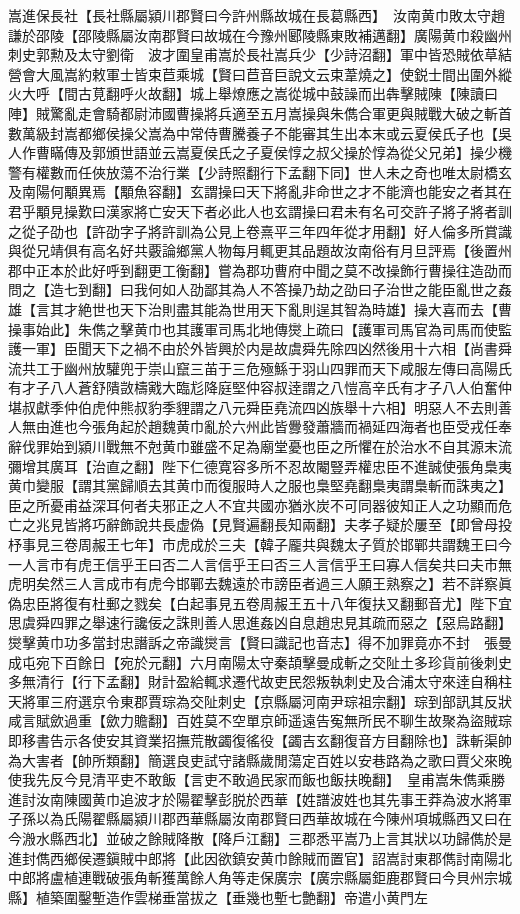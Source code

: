 嵩進保長社【長社縣屬潁川郡賢曰今許州縣故城在長葛縣西】　汝南黄巾敗太守趙謙於邵陵【邵陵縣屬汝南郡賢曰故城在今豫州郾陵縣東敗補邁翻】廣陽黄巾殺幽州刺史郭勲及太守劉衛　波才圍皇甫嵩於長社嵩兵少【少詩沼翻】軍中皆恐賊依草結營會大風嵩約敕軍士皆束苣乘城【賢曰苣音巨說文云束葦燒之】使鋭士間出圍外縱火大呼【間古莧翻呼火故翻】城上舉燎應之嵩從城中鼓譟而出犇擊賊陳【陳讀曰陣】賊驚亂走會騎都尉沛國曹操將兵適至五月嵩操與朱儁合軍更與賊戰大破之斬首數萬級封嵩都鄉侯操父嵩為中常侍曹騰養子不能審其生出本末或云夏侯氏子也【吳人作曹瞞傳及郭頒世語並云嵩夏侯氏之子夏侯惇之叔父操於惇為從父兄弟】操少機警有權數而任俠放蕩不治行業【少詩照翻行下孟翻下同】世人未之奇也唯太尉橋玄及南陽何顒異焉【顒魚容翻】玄謂操曰天下將亂非命世之才不能濟也能安之者其在君乎顒見操歎曰漢家將亡安天下者必此人也玄謂操曰君未有名可交許子將子將者訓之從子劭也【許劭字子將許訓為公見上卷熹平三年四年從才用翻】好人倫多所賞識與從兄靖俱有高名好共覈論鄉黨人物每月輒更其品題故汝南俗有月旦評焉【後置州郡中正本於此好呼到翻更工衡翻】嘗為郡功曹府中聞之莫不改操飾行曹操往造劭而問之【造七到翻】曰我何如人劭鄙其為人不答操乃劫之劭曰子治世之能臣亂世之姦雄【言其才絶世也天下治則盡其能為世用天下亂則逞其智為時雄】操大喜而去【曹操事始此】朱儁之擊黄巾也其護軍司馬北地傳爕上疏曰【護軍司馬官為司馬而使監護一軍】臣聞天下之禍不由於外皆興於内是故虞舜先除四凶然後用十六相【尚書舜流共工于幽州放驩兜于崇山竄三苖于三危殛鯀于羽山四罪而天下咸服左傳曰高陽氏有才子八人蒼舒隤敳檮戭大臨尨降庭堅仲容叔逹謂之八愷高辛氏有才子八人伯奮仲堪叔獻季仲伯虎仲熊叔豹季貍謂之八元舜臣堯流四凶族舉十六相】明惡人不去則善人無由進也今張角起於趙魏黄巾亂於六州此皆釁發蕭牆而禍延四海者也臣受戎任奉辭伐罪始到潁川戰無不尅黄巾雖盛不足為廟堂憂也臣之所懼在於治水不自其源末流彌增其廣耳【治直之翻】陛下仁德寛容多所不忍故閹豎弄權忠臣不進誠使張角梟夷黄巾變服【謂其黨歸順去其黄巾而復服時人之服也梟堅堯翻梟夷謂梟斬而誅夷之】臣之所憂甫益深耳何者夫邪正之人不宜共國亦猶氷炭不可同器彼知正人之功顯而危亡之兆見皆將巧辭飾說共長虚偽【見賢遍翻長知兩翻】夫孝子疑於屢至【即曾母投杼事見三卷周赧王七年】市虎成於三夫【韓子龎共與魏太子質於邯鄲共謂魏王曰今一人言市有虎王信乎王曰否二人言信乎王曰否三人言信乎王曰寡人信矣共曰夫市無虎明矣然三人言成市有虎今邯鄲去魏遠於市謗臣者過三人願王熟察之】若不詳察眞偽忠臣將復有杜郵之戮矣【白起事見五卷周赧王五十八年復扶又翻郵音尤】陛下宜思虞舜四罪之舉速行讒佞之誅則善人思進姦凶自息趙忠見其疏而惡之【惡烏路翻】爕擊黄巾功多當封忠譖訴之帝識爕言【賢曰識記也音志】得不加罪竟亦不封　張曼成屯宛下百餘日【宛於元翻】六月南陽太守秦頡擊曼成斬之交阯土多珍貨前後刺史多無清行【行下孟翻】財計盈給輒求遷代故吏民怨叛執刺史及合浦太守來逹自稱柱天將軍三府選京令東郡賈琮為交阯刺史【京縣屬河南尹琮祖宗翻】琮到部訊其反狀咸言賦歛過重【歛力贍翻】百姓莫不空單京師遥遠告寃無所民不聊生故聚為盜賊琮即移書告示各使安其資業招撫荒散蠲復徭役【蠲吉玄翻復音方目翻除也】誅斬渠帥為大害者【帥所類翻】簡選良吏試守諸縣歲閒蕩定百姓以安巷路為之歌曰賈父來晚使我先反今見清平吏不敢飯【言吏不敢過民家而飯也飯扶晚翻】　皇甫嵩朱儁乘勝進討汝南陳國黄巾追波才於陽翟擊彭脱於西華【姓譜波姓也其先事王莽為波水將軍子孫以為氏陽翟縣屬潁川郡西華縣屬汝南郡賢曰西華故城在今陳州項城縣西又曰在今溵水縣西北】並破之餘賊降散【降戶江翻】三郡悉平嵩乃上言其狀以功歸儁於是進封儁西鄉侯遷鎭賊中郎將【此因欲鎮安黄巾餘賊而置官】詔嵩討東郡儁討南陽北中郎將盧植連戰破張角斬獲萬餘人角等走保廣宗【廣宗縣屬鉅鹿郡賢曰今貝州宗城縣】植築圍鑿塹造作雲梯垂當拔之【垂幾也塹七艶翻】帝遣小黄門左